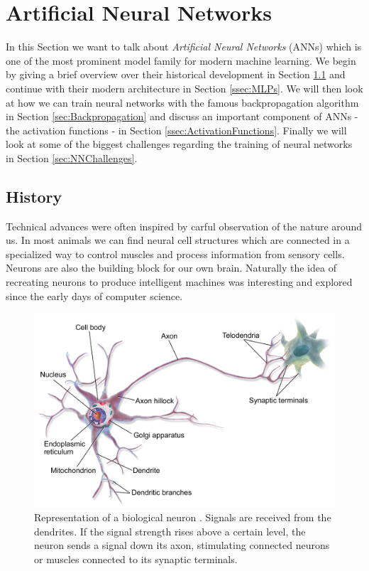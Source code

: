 \section{Artificial Neural Networks} \label{sec:ANNs}
In this Section we want to talk about \textit{Artificial Neural Networks} (ANNs) which is one of the most prominent model family for modern machine learning. We begin by giving a brief overview over their historical development in Section \ref{ssec:ANNHistory} and continue with their modern architecture in Section \ref{ssec:MLPs}. We will then look at how we can train neural networks with the famous backpropagation algorithm in Section \ref{sec:Backpropagation} and discuss an important component of ANNs - the activation functions - in Section \ref{ssec:ActivationFunctions}. Finally we will look at some of the biggest challenges regarding the training of neural networks in Section \ref{sec:NNChallenges}.

\subsection{History} \label{ssec:ANNHistory}
Technical advances were often inspired by carful observation of the nature around us. In most animals we can find neural cell structures which are connected in a specialized way to control muscles and process information from sensory cells. Neurons are also the building block for our own brain. Naturally the idea of recreating neurons to produce intelligent machines was interesting and explored since the early days of computer science. 

\begin{figure}[ht]
    
  \begin{center}
      \includegraphics[clip, width=0.75\columnwidth]{figures/deeplearning/neuron.png}
  \end{center}
  
  \caption[Biological Neuron]{Representation of a biological neuron \cite{blaus2013Neuron}. Signals are received from the dendrites. If the signal strength rises above a certain level, the neuron sends a signal down its axon, stimulating connected neurons or muscles connected to its synaptic terminals.}
  \label{fig:biological_neuron}
\end{figure}


